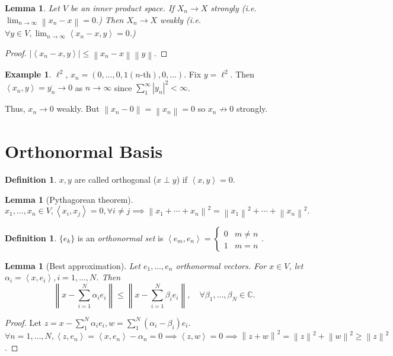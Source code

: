 \documentclass{report}
\newcommand{\C}{\mathbb{C}}
\newcommand{\inner}[2]{\left\langle #1, #2\right\rangle}
\newcommand{\norm}[1]{\left\| #1 \right\|}
\newtheorem{lemma}[theorem]{Lemma}
\theoremstyle{definition}
\newtheorem{definition}[theorem]{Definition}
\newtheorem{example}[theorem]{Example}
\theoremstyle{remark}
\begin{document}
\begin{lemma}
	Let $V$ be an inner product space. If $X_n \to X$ strongly (i.e. $\lim_{n \to \infty} \norm{x_n - x} = 0$.) Then $X_n \to X$ weakly (i.e. $\forall y \in V, \lim_{n \to \infty}\inner{x_n - x}{y} = 0$.)
\end{lemma}
\begin{proof}
	$|\inner{x_n - x}{y}| \leq \norm{x_n - x}\norm{y}$.
\end{proof}
\begin{example}
	$\ell^2$, $x_n = (0, \ldots, 0, 1 (\text{$n$-th}), 0, \ldots)$.
	Fix $y = \ell^2$. Then $\inner{x_n}{y} = \overline{y_n} \to 0$ as $n \to \infty$ since $\sum_{1}^\infty |y_n|^2 < \infty$. 
	
	Thus, $x_n \to 0$ weakly. But $\norm{x_n - 0} = \norm{x_n} = 0$ so $x_n \not\to 0$ strongly.
\end{example}

\section{Orthonormal Basis}
\begin{definition}
	$x, y$ are called orthogonal ($x \perp y$) if $\inner{x}{y} = 0$.
\end{definition}
\begin{lemma}[Pythagorean theorem]
	\[x_1, \ldots, x_n \in V, \inner{x_i}{x_j} = 0, \forall i \neq j \implies \norm{x_1 + \cdots + x_n}^2 = \norm{x_1}^2 + \cdots + \norm{x_n}^2.\]
\end{lemma}
\begin{definition}
	$\{e_k\}$ is an \emph{orthonormal set} is $\inner{e_m}{e_n} = \begin{cases}
		0 & m \neq n \\
		1 & m = n
	\end{cases}$.
\end{definition}
\begin{lemma}
	[Best approximation] Let $e_1, \ldots, e_n$ orthonormal vectors. For $x \in V$, let $\alpha_i = \inner{x}{e_i}, i = 1, \ldots, N$. Then \[
		\norm{x - \sum_{i=1}^N \alpha_i e_i} \leq \norm{x - \sum_{i=1}^N \beta_i e_i}, \quad \forall \beta_1, \ldots, \beta_N \in \C.
	\]
\end{lemma}
\begin{proof}
	Let $z = x - \sum_1^N \alpha_i e_i, w = \sum_1^N(\alpha_i - \beta_i)e_i$. $\forall n = 1, \ldots, N, \inner{z}{e_n} = \inner{x}{e_n} - \alpha_n = 0 \implies \inner{z}{w} = 0 \implies \norm{z + w}^2 = \norm{z}^2 + \norm{w}^2 \geq \norm{z}^2$.
\end{proof}
\end{document}

